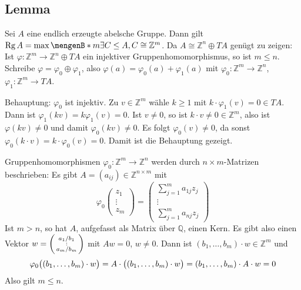 \subsection[Lemma: Rang einer endlich erzeugten abelschen Gruppe]{Lemma} %
\label{sub:42}
Sei $A$ eine endlich erzeugte abelsche Gruppe. Dann gilt $\Rg A = \max \set[m]{\exists C \le A, C \cong \mathds{Z}^m}$.
Da $A \cong \mathds{Z}^n \oplus T A$ genügt zu zeigen: Ist $\varphi : \mathds{Z}^m \to \mathds{Z}^n \oplus T A$ ein injektiver Gruppenhomomorphismus, so ist $m \le n$.
Schreibe $\varphi = \varphi_0 \oplus \varphi_1$, also $\varphi(a) = \varphi_0(a) + \varphi_1(a)$ mit $\varphi_0 : \mathds{Z}^m \to \mathds{Z}^n$, 
$\varphi_1 : \mathds{Z}^m \to T A$. 

Behauptung: $\varphi_0$ ist injektiv. Zu $v \in \mathds{Z}^m$ wähle $k\ge 1$ mit $k \cdot \varphi_1(v) = 0 \in T A$. Dann ist $\varphi_1(k v) = k \varphi_1(v)=0$.
Ist $v \not= 0$, so ist $k \cdot v \not= 0 \in \mathds{Z}^m$, also ist $\varphi(k v) \not= 0$ und damit $\varphi_0(k v) \not= 0$. Es folgt $\varphi_0(v) \not= 0$, da sonst
$\varphi_0(k \cdot v) = k \cdot \varphi_0(v)= 0$. Damit ist die Behauptung gezeigt.

Gruppenhomomorphismen $\varphi_0 : \mathds{Z}^m \to \mathds{Z}^n$ werden durch $n \times m$-Matrizen beschrieben: Es gibt $A= (a_{ij}) \in \mathds{Z}^{n \times m}$ mit
\[
	\varphi_0 \begin{pmatrix}
		z_1 \\ \vdots \\ z_m
	\end{pmatrix} = \begin{pmatrix}
		\sum_{j=1}^{m} a_{1j} z_j \\
		\vdots \\
		\sum_{j=1}^{m} a_{nj} z_j
	\end{pmatrix}
\]
Ist $m >n$, so hat $A$, aufgefasst als Matrix über $\mathds{Q}$, einen Kern. Es gibt also einen Vektor $w = \begin{psmallmatrix}a_1/b_1 \\ : \\ a_m/b_m\end{psmallmatrix}$
mit $A w = 0$, $w \not=0$. Dann ist $(b_1, \ldots , b_m) \cdot w \in \mathds{Z}^m$ und 
\[
	\varphi_0 \enbrace[\big]{(b_1, \ldots , b_m)\cdot w} = A \cdot \enbrace[\big]{(b_1, \ldots , b_m) \cdot w} = (b_1, \ldots , b_m) \cdot A \cdot w = 0 
\]
Also gilt $m \le n$. \bewende

